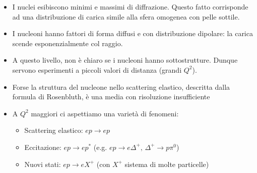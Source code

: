 \begin{itemize}
    \item I nuclei esibiscono minimi e massimi di diffrazione. Questo fatto corrisponde ad una distribuzione di carica simile alla sfera omogenea con pelle sottile.
    \item I nucleoni hanno fattori di forma diffusi e con distribuzione dipolare: la carica scende esponenzialmente col raggio.
    \item A questo livello, non è chiaro se i nucleoni hanno sottostrutture. Dunque servono esperimenti a piccoli valori di distanza (grandi $Q^2$).
    \item Forse la struttura del nucleone nello scattering elastico, descritta dalla formula di Rosenbluth, è una media con risoluzione insufficiente
    \item A $Q^2$ maggiori ci aspettiamo una varietà di fenomeni:
    \begin{itemize}
        \item Scattering elastico: $ep\to ep$
        \item Eccitazione: $ep\to ep^*$ (e.g. $ep\to e\Delta^+,\,\Delta^+\to p\pi^0$)
        \item Nuovi stati: $ep\to eX^+$ (con $X^+$ sistema di molte particelle)
    \end{itemize}
\end{itemize}
